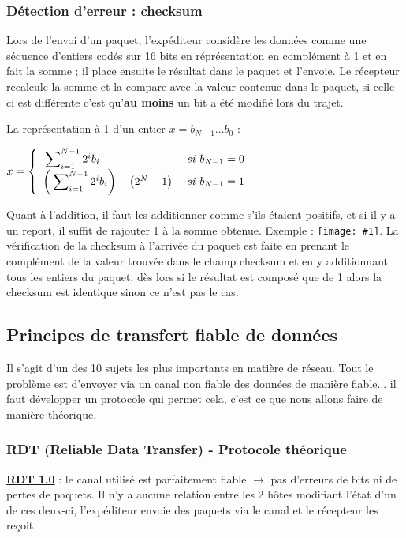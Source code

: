 \documentclass{article}
\newcommand{\imageRT}[2]{\texttt{[image: \#1]}}
\newcommand{\sumin}[3]{\sideset{}{_{i=#1}^{#2}}\sum{#3}}
\begin{document}
\subsubsection{Détection d'erreur : checksum}

Lors de l'envoi d'un paquet, l'expéditeur considère les données comme une séquence d'entiers codés sur 16 bits en 
réprésentation en complément à 1 et en fait la somme ; il place ensuite le résultat dans le paquet et l'envoie.
Le récepteur recalcule la somme et la compare avec la valeur contenue dans le paquet, si celle-ci est différente 
c'est qu'\textbf{au moins} un bit a été modifié lors du trajet.

La représentation à 1 d'un entier $x = b_{N-1}...b_0$ : 
\begin{center}
$x = \left\{ 
\begin{array}{l @{\ \ \ \ si\ } r}
\sumin{1}{N-1}{2^ib_i} & b_{N-1} = 0 \\
\left(\sumin{1}{N-1}{2^ib_i}\right) - \left(2^N-1\right) & b_{N-1} = 1 \\
\end{array}\right.$
\end{center}

Quant à l'addition, il faut les additionner comme s'ils étaient positifs, et si il y a un report, il suffit de 
rajouter 1 à la somme obtenue. Exemple : \imageRT{CN_027.png}{50}. La vérification de la checksum à l'arrivée du
paquet est faite en prenant le complément de la valeur trouvée dans le champ checksum et en y additionnant tous
les entiers du paquet, dès lors si le résultat est composé que de 1 alors la checksum est identique sinon ce
n'est pas le cas.

\subsection{Principes de transfert fiable de données}

Il s'agit d'un des 10 sujets les plus importants en matière de réseau. Tout le problème est d'envoyer via un 
canal non fiable des données de manière fiable... il faut développer un protocole qui permet cela, c'est ce
que nous allons faire de manière théorique.

\subsubsection{RDT (Reliable Data Transfer) - Protocole théorique}

\textbf{\underline{RDT 1.0}} : le canal utilisé est parfaitement fiable $\rightarrow$ pas d'erreurs de bits ni 
de pertes de paquets. Il n'y a aucune relation entre les 2 hôtes modifiant l'état d'un de ces deux-ci, 
l'expéditeur envoie des paquets via le canal et le récepteur les reçoit.
\end{document}
